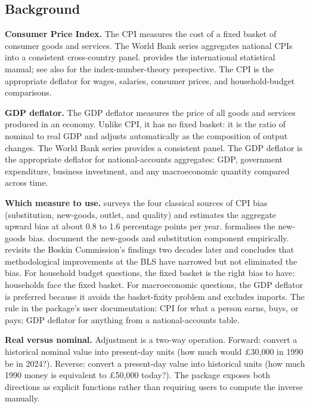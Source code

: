 \subsection{Background}\label{background}

\textbf{Consumer Price Index.} The CPI measures the cost of a fixed
basket of consumer goods and services. The World Bank series
 aggregates national CPIs into a consistent
cross-country panel. \citet{ilo2004cpi} provides the international
statistical manual; see also \citet{diewert1998index} for the
index-number-theory perspective. The CPI is the appropriate deflator for
wages, salaries, consumer prices, and household-budget comparisons.

\textbf{GDP deflator.} The GDP deflator measures the price of all goods
and services produced in an economy. Unlike CPI, it has no fixed basket:
it is the ratio of nominal to real GDP and adjusts automatically as the
composition of output changes. The World Bank series
 provides a consistent panel. The GDP deflator is
the appropriate deflator for national-accounts aggregates: GDP,
government expenditure, business investment, and any macroeconomic
quantity compared across time.

\textbf{Which measure to use.} \citet{hausman2003sources} surveys the
four classical sources of CPI bias (substitution, new-goods, outlet, and
quality) and estimates the aggregate upward bias at about 0.8 to 1.6
percentage points per year. \citet{feenstra1994new} formalises the
new-goods bias. \citet{broda2010product} document the new-goods and
substitution component empirically. \citet{moulton2018measurement}
revisits the Boskin Commission's findings two decades later and
concludes that methodological improvements at the BLS have narrowed but
not eliminated the bias. For household budget questions, the fixed
basket is the right bias to have: households face the fixed basket. For
macroeconomic questions, the GDP deflator is preferred because it avoids
the basket-fixity problem and excludes imports. The rule in the
package's user documentation: CPI for what a person earns, buys, or
pays; GDP deflator for anything from a national-accounts table.

\textbf{Real versus nominal.} Adjustment is a two-way operation.
Forward: convert a historical nominal value into present-day units (how
much would \pounds 30,000 in 1990 be in 2024?). Reverse: convert a
present-day value into historical units (how much 1990 money is
equivalent to \pounds 50,000 today?). The package exposes both
directions as explicit functions rather than requiring users to compute
the inverse manually.

